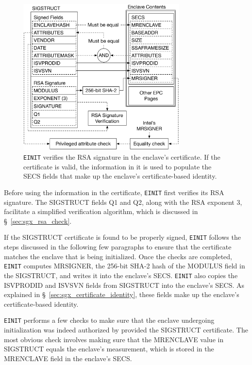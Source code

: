 \begin{figure}[hbt]
  \centering
  \includegraphics[width=85mm]{figures/sgx_einit_sigstruct.pdf}
  \caption{
    \texttt{EINIT} verifies the RSA signature in the enclave's certificate. If
    the certificate is valid, the information in it is used to populate the
    SECS fields that make up the enclave's certificate-based identity.
  }
  \label{fig:sgx_einit_sigstruct}
\end{figure}


Before using the information in the certificate, \texttt{EINIT} first verifies
its RSA signature. The SIGSTRUCT fields Q1 and Q2, along with the RSA exponent
3, facilitate a simplified verification algorithm, which is discussed in
\S~\ref{sec:sgx_rsa_check}.

If the SIGSTRUCT certificate is found to be properly signed, \texttt{EINIT}
follows the steps discussed in the following few paragraphs to ensure that the
certificate matches the enclave that is being initialized. Once the checks are
completed, \texttt{EINIT} computes MRSIGNER, the 256-bit SHA-2 hash of the
MODULUS field in the SIGSTRUCT, and writes it into the enclave's SECS.
\texttt{EINIT} also copies the ISVPRODID and ISVSVN fields from SIGSTRUCT into
the enclave's SECS. As explained in \S~\ref{sec:sgx_certificate_identity},
these fields make up the enclave's certificate-based identity.

\texttt{EINIT} performs a few checks to make sure that the enclave undergoing
initialization was indeed authorized by provided the SIGSTRUCT certificate. The
most obvious check involves making sure that the MRENCLAVE value in SIGSTRUCT
equals the enclave's measurement, which is stored in the MRENCLAVE field in
the enclave's SECS.

